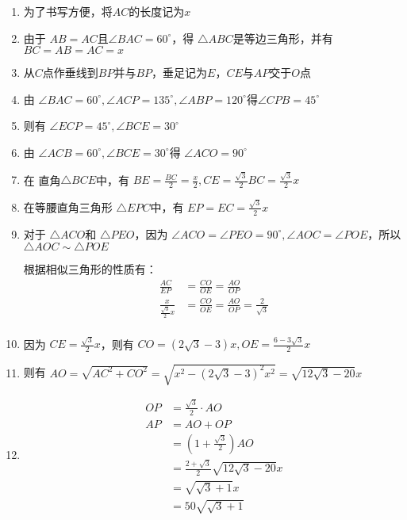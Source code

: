 \documentclass[answers]{exam}
\begin{document}
\begin{questions}
	\begin{solution}
		\begin{enumerate}[label=\zhnum{*}、, noitemsep]
			\item 为了书写方便，将$AC$的长度记为$x$
			\item 由于 \( AB=AC\)且\( \angle{BAC}=60^\circ \)，得 \( \triangle{ABC}是等边三角形 \)，并有 \( BC=AB=AC=x \)
			\item 从$C$点作垂线到$BP$并与$BP$，垂足记为$E$，$CE$与$AP$交于$O$点
			\item 由 \( \angle{BAC}=60^\circ, \angle{ACP}=135^\circ, \angle{ABP}=120^\circ \)得$\angle{CPB}=45^\circ$
			\item 则有 \( \angle{ECP} = 45^\circ, \angle{BCE}=30^\circ \)
			\item 由 \( \angle{ACB}=60^\circ, \angle{BCE}=30^\circ \)得 \( \angle{ACO}=90^\circ \)
			\item 在 直角\( \triangle{BCE} \)中，有 \( BE=\frac{BC}{2} = \frac{x}{2}, CE=\frac{\sqrt{3}}{2}BC =
			      \frac{\sqrt{3}}{2}x \)
			\item 在等腰直角三角形 \( \triangle{EPC} \)中，有 \( EP = EC = \frac{\sqrt{3}}{2}x \)
			\item 对于 \( \triangle{ACO} \)和 \( \triangle{PEO} \)，因为 \( \angle{ACO} = \angle{PEO} = 90^\circ,
			      \angle{AOC} = \angle{POE} \)，所以 \( \triangle{AOC} \sim \triangle{POE} \)

			      根据相似三角形的性质有：
			      \begin{align*}
				      \frac{AC}{EP}                 & = \frac{CO}{OE} = \frac{AO}{OP}                     \\
				      \frac{x}{\frac{\sqrt{3}}{2}x} & = \frac{CO}{OE} = \frac{AO}{OP}= \frac{2}{\sqrt{3}} \\
			      \end{align*}
			\item 因为 \( CE=\frac{\sqrt{3}}{2}x \)，则有 \( CO = (2\sqrt{3} - 3)x, OE = \frac{6 - 3\sqrt{3}}{2}x \)
			\item 则有 \( AO = \sqrt{AC^2 + CO^2} = \sqrt{x^2 - (2\sqrt{3} - 3)^2x^2} = \sqrt{12\sqrt{3} - 20}x \)
			\item
			      \begin{align*}
				      OP & = \frac{\sqrt{3}}{2} \cdot AO               \\
				      AP & = AO + OP                                   \\
				         & = (1+\frac{\sqrt{3}}{2})AO                  \\
				         & = \frac{2+\sqrt{3}}{2}\sqrt{12\sqrt{3}-20}x \\
				         & = \sqrt{\sqrt{3} + 1}x                      \\
				         & = 50\sqrt{\sqrt{3} + 1}
			      \end{align*}


\end{enumerate}
\end{solution}
\end{questions}
\end{document}
